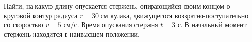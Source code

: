 Найти, на какую длину опускается стержень,
опирающийся своим концом о круговой контур радиуса $r = 30$ см
кулака, движущегося возвратно-поступательно со скоростью $v = 5$ см/с.
Время опускания стержня $t = 3$ с.
В начальный момент стержень находится в наивысшем положении.
